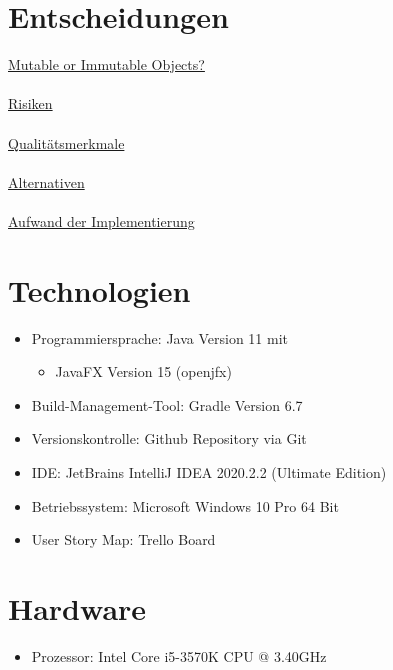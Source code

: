 \section{Entscheidungen}
\underline{Mutable or Immutable Objects?}\\~\\
\underline{Risiken}\\~\\
\underline{Qualitätsmerkmale}\\~\\
\underline{Alternativen}\\~\\
\underline{Aufwand der Implementierung}

\section{Technologien}

\begin{itemize}
    \item Programmiersprache: Java Version 11 mit
    \begin{itemize}
        \item JavaFX Version 15 (openjfx)
    \end{itemize}
    \item Build-Management-Tool: Gradle\cite{gradle} Version 6.7
    \item Versionskontrolle: Github Repository\cite{github} via Git\cite{git}
    \item IDE: JetBrains IntelliJ IDEA\cite{idea} 2020.2.2 (Ultimate Edition)
    \item Betriebssystem: Microsoft Windows 10 Pro 64 Bit
    \item User Story Map: Trello Board\cite{trello}
\end{itemize}

\section{Hardware}

\begin{itemize}
    \item Prozessor: Intel Core i5-3570K CPU @ 3.40GHz
\end{itemize}